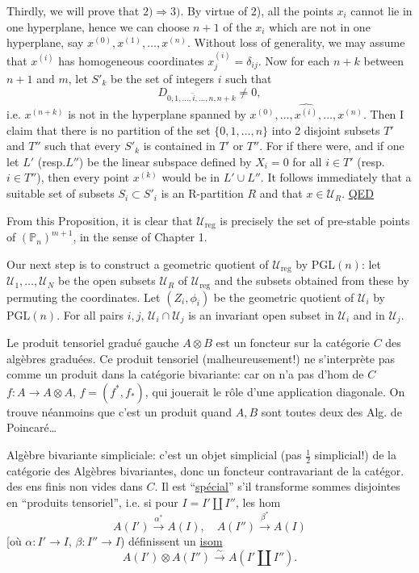 Thirdly, we will prove that $2)\Rightarrow3)$. By virtue of 2), all the points $x_i$ cannot lie in one hyperplane, hence we can choose $n+1$ of the $x_i$ which are not in one hyperplane, say $x^{(0)},x^{(1)},\ldots,x^{(n)}$. Without loss of generality, we may assume that $x^{(i)}$ has homogeneous coordinates $x_j^{(i)}=\delta_{ij}$. Now for each $n+k$ between $n+1$ and $m$, let $S'_k$ be the set of integers $i$ such that
\[
D_{0,1,\ldots,\hat i,\ldots,n,n+k}\ne0,
\]
i.e. $x^{(n+k)}$ is not in the hyperplane spanned by $x^{(0)},\ldots,\widehat{x^{(i)}},\ldots,x^{(n)}$. Then I claim that there is no partition of the set $\{0,1,\ldots,n\}$ into 2 disjoint subsets $T'$ and $T''$ such that every $S'_k$ is contained in $T'$ or $T''$. For if there were, and if one let $L'$ (resp.$L''$) be the linear subspace defined by $X_i=0$ for all $i\in T'$ (resp. $i\in T''$), then every point $x^{(k)}$ would be in $L'\cup L''$. It follows immediately that a suitable set of subsets $S_i\subset S'_i$ is an R-partition $R$ and that $x\in\mathcal U_R$. \uline{QED}

From this Proposition, it is clear that $\mathcal U_{\mathrm{reg}}$ is precisely the set of pre-stable points of $(\mathbb P_n)^{m+1}$, in the sense of Chapter 1.

Our next step is to construct a geometric quotient of $\mathcal U_{\mathrm{reg}}$ by $\mathrm{PGL}(n)$: let $\mathcal U_1,\ldots,\mathcal U_N$ be the open subsets $\mathcal U_R$ of $\mathcal U_{\mathrm{reg}}$ and the subsets obtained from these by permuting the coordinates. Let $(Z_i,\phi_i)$ be the geometric quotient of $\mathcal U_i$ by $\mathrm{PGL}(n)$. For all pairs $i,j$, $\mathcal U_i\cap\mathcal U_j$ is an invariant open subset in $\mathcal U_i$ and in $\mathcal U_j$.

Le produit tensoriel gradué gauche $A\otimes B$ est un foncteur sur la catégorie $C$  des algèbres graduées. Ce produit tensoriel (malheureusement!) ne s'interprète pas comme un produit dans la catégorie bivariante: car on n'a pas d'hom de $C$  $f:A\longrightarrow A\otimes A$, $f=(f^*,f_*)$, qui jouerait le rôle d'une application diagonale. On trouve néanmoins que c'est un produit  quand $A,B$ sont toutes deux des Alg. de Poincaré\ldots

Algèbre bivariante simpliciale: c'est un objet simplicial (pas \uline{$\frac12$} simplicial!) de la catégorie des Algèbres bivariantes, donc un foncteur contravariant de la catégor. des ens finis non vides dans $C$. Il est ``\uline{spécial}'' s'il transforme sommes disjointes en ``produits tensoriel'', i.e. si pour $I=I'\amalg I''$, les hom
\[
A(I')\xrightarrow{\alpha^*} A(I),\quad A(I'')\xrightarrow{\beta^*} A(I)
\]
[où $\alpha:I'\longrightarrow I$, $\beta:I''\longrightarrow I$) définissent un \uline{isom}
\[
A(I')\otimes A(I'')\xrightarrow{\sim}A(I'\amalg I'').
\]

